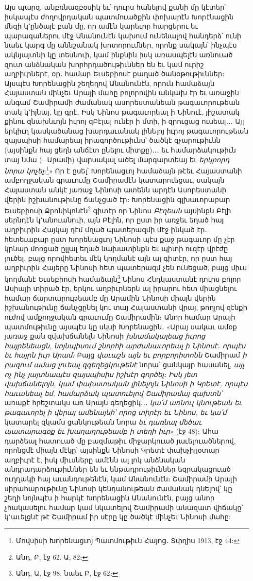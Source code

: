 \documentclass{article}
\begin{document}
{Այս պարզ, անբռնազբօսիկ եւ՝ դուրս հանելով քանի մը կէտեր՝ իսկապէս ժողովրդական պատմուածքին փոխարէն Խորէնացին մեզի կ՚ընծայէ բան մը, որ ամէն կարեւոր հարցերու եւ պարագաներու մէջ Անանունէն կախում ունենալով հանդերձ՝ ունի նաեւ կարգ մը աննշանակ խոտորումներ, որոնք սակայն՝ ինչպէս ակնյայտնի կը տեսնուի, կամ ինքնին իսկ առասպելէն առնուած զուտ անձնական խորհրդածութիւններ են եւ կամ ուրիշ աղբիւրներէ, օր․ համար Եւսեբիոսէ քաղած ծանօթութիւններ։ Այսպէս Խորենացին շեղեղով Անանունէն, որուն համաձայն Հայաստան մինչեւ Արայի մահը բոլորովին անկախ էր եւ առաջին անգամ Շամիրամի ժամանակ ասորեստանեան թագաւորութեան տակ կ՚իյնայ, կը գրէ․ Իսկ Նինոս թագաւորեալ ի Նինուէ, յիշատակ քինու զնախնւոյն իւրոյ զԲէլայ ունէր ի մտի, ի զրուցաց ուսեալ․․․ Այլ երկիւղ կասկածանաց խարդաւանակ լինելոյ իւրոյ թագաւորութեան զայսպիսի համարեալ իրագործութիւնս՝ ծածկէ զչարութիւնն (այսինքն հայ ցեղն անճէտ ընելու միտքը)․․․ եւ համարձակութիւն տայ նմա (=Արամի) վարսակալ ածել մարգարտեայ եւ \emph{երկրորդ նորա կոչել}։\footnote{Մովսիսի Խորենացւոյ Պատմութիւն Հայոց․ Տփղիս 1913, էջ 44։}» Որ է ըսել՝ Խորենացւոյ համաձայն թէեւ Հայաստանի ամբողջական գրաւումը Շամիրամէն կատարուեցաւ, սակայն Հայաստան անկէ յառաջ Նինոսի ատենն արդէն Ասորեստանի վերին իշխանութիւնը ճանչցած էր։ Խորենացին գլխաւորաբար Եւսեբիոսի Քրոնիկոնէն\footnote{Անդ, Բ, էջ 62. Ա, 82։} գիտէր որ Նինոս \emph{Բէղեան} այսինքն Բէլի սերնդէն կ՚անուանուի, այն Բէլին, որ ըստ իր առջեւ եղած հայ աղբիւրին Հայկայ դէմ մղած պատերազմի մէջ ինկած էր․ հետեւաբար ըստ Խորենացւոյ Նինոսի պէս քաջ թագաւոր մը չէր կրնար մոռցած ըլլալ եղած նախատինքն եւ պիտի ուզէր վրէժը լուծել, բայց որովհետեւ մէկ կողմանէ այն ալ գիտէր, որ ըստ հայ աղբիւրին Հայերը Նինոսի հետ պատերազմ չեն ունեցած, բայց միւս կողմանէ Եւսեբիոսի համաձայն\footnote{Անդ, Ա, էջ 98. նաեւ Բ, էջ 62։} Նինոս Հնդկաստանէ դուրս բոլոր Ասիայի տիրած էր, երկու աղբիւրներն ալ իրարու հետ միացնելու համար ճարտարութեամբ մը Արամին Նինոսի միայն վերին իշխանութիւնը ճանչցընել կու տայ Հայաստանի վրայ, թողլով զէնքի ուժով ամքողջական գրաւումը Շամիրամին։ Անոր համար Արայի պատմութիւնը այսպէս կը սկսի Խորենացին․ «Արայ սակաւ ամօք յառաջ քան զվախճանելն Նինոսի \emph{խնամակալեաց իւրոց հայրենեացն, նոյնպիսում շնորհի արժանաւորեալ ի Նինոսէ․ որպէս եւ հայրն իւր Արամ։} Բայց \emph{վաւաշն այն եւ բորբորիտոնն} Շամիրամ \emph{ի բազում ամաց լուեալ զգեղեցկութենէ} նորա՝ ցանկայր հասանել, \emph{այլ ոչ ինչ յայտնապէս զայսպիսիս իշխէր գործել։ Իսկ յետ վախճանելոյն, կամ փախստական լինելոյն Նինոսի ի Կրետէ, որպէս հաւանեալ եմ, համարձակ պատուելով Շամիրամայ զախտն՝} առաքէ հրեշտակս առ Արայն գեղեցիկ․․․ \emph{կա՛մ առնուլ կնութեան եւ թագաւորել ի վերայ ամենայնի՝ որոց տիրէր եւ Նինոս, եւ կա՛մ} կատարել զկամս ցանկութեան նորա \emph{եւ դառնալ մեծաւ պատարագօք եւ խաղաղութեամբ ի տեղի իւր}» (էջ 48)։ Ահա դարձեալ հատուած մը բազմաթիւ միջարկուած յաւելուածներով, որոնցմէ միայն մէկը՝ այսինքն Նինոսի Կրետէ փախչիլլօտար աղբիւրէ է, իսկ միւսները ամէնն ալ լոկ անձնական անդրադարձութիւններ են եւ ենթադրութիւններ եզրակացուած ուղղակի հայ աւանդութենէն, կամ Անանունէն։ Շամիրամի Արայի սիրահարութիւնը Նինոսի կենդանութեան ժամանակ դնելով՝ կը շեղի նոյնպէս ի հարկէ Խորենացին Անանունէն, բայց անոր չհակասելու համար կամ նկատելով Շամիրամի անազատ վիճակը՝ կ՚աւելցնէ թէ Շամիրամ իր սէրը կը ծածկէ մինչեւ Նինոսի մահը։

}
\end{document}
